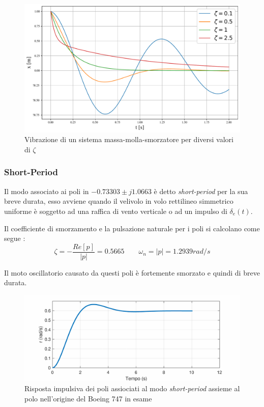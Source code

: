 \begin{figure}[H]
    \centering
    \includegraphics[width=0.65\linewidth]{Immagini/vibrazione_sistema.pdf}
    \caption{Vibrazione di un sistema massa-molla-smorzatore per diversi valori di $\zeta$}
\end{figure}

\subsubsection{Short-Period}\label{subsubsec:short_period}

Il modo associato ai poli in $-0.73303 \pm j1.0663$ è detto \textit{short-period} per la sua breve durata, esso avviene quando il velivolo in volo rettilineo simmetrico uniforme è soggetto ad una raffica di vento verticale o ad un impulso di $\delta_e(t)$.

Il coefficiente di smorzamento e la pulsazione naturale per i poli si calcolano come segue \cite{zampieri_dispensa_controlli}:
\begin{equation*}
    \zeta = - \frac{Re[p]}{\left|p\right|} = 0.5665 \qquad \omega_n = \left|p\right| = 1.2939rad/s
\end{equation*}

Il moto oscillatorio causato da questi poli è fortemente smorzato e quindi di breve durata.

\begin{figure}[H]
    \centering
    \includegraphics[width=0.7\linewidth]{Immagini/shortperiod_mode.pdf}
    \caption{Risposta impulsiva dei poli assiociati al modo \textit{short-period} assieme al polo nell'origine del Boeing 747 in esame}
\end{figure}

